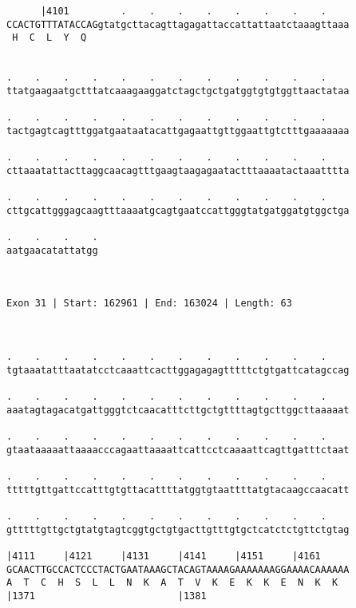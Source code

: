\documentclass{article}
\begin{document}
\begin{Verbatim}
      |4101         .    .    .    .    .    .    .    .    
CCACTGTTTATACCAGgtatgcttacagttagagattaccattattaatctaaagttaaa
 H  C  L  Y  Q                                              
                                                            
  
.    .    .    .    .    .    .    .    .    .    .    .    
ttatgaagaatgctttatcaaagaaggatctagctgctgatggtgtgtggttaactataa
                                                            
.    .    .    .    .    .    .    .    .    .    .    .    
tactgagtcagtttggatgaataatacattgagaattgttggaattgtctttgaaaaaaa
                                                            
.    .    .    .    .    .    .    .    .    .    .    .    
cttaaatattacttaggcaacagtttgaagtaagagaatactttaaaatactaaatttta
                                                            
.    .    .    .    .    .    .    .    .    .    .    .    
cttgcattgggagcaagtttaaaatgcagtgaatccattgggtatgatggatgtggctga
                                                            
.    .    .    .
aatgaacatattatgg
                
                
 
Exon 31 | Start: 162961 | End: 163024 | Length: 63



.    .    .    .    .    .    .    .    .    .    .    .    
tgtaaatatttaatatcctcaaattcacttggagagagtttttctgtgattcatagccag
                                                            
.    .    .    .    .    .    .    .    .    .    .    .    
aaatagtagacatgattgggtctcaacatttcttgctgttttagtgcttggcttaaaaat
                                                            
.    .    .    .    .    .    .    .    .    .    .    .    
gtaataaaaattaaaacccagaattaaaattcattcctcaaaattcagttgatttctaat
                                                            
.    .    .    .    .    .    .    .    .    .    .    .    
tttttgttgattccatttgtgttacattttatggtgtaattttatgtacaagccaacatt
                                                            
.    .    .    .    .    .    .    .    .    .    .    .    
gtttttgttgctgtatgtagtcggtgctgtgacttgtttgtgctcatctctgttctgtag
                                                            
|4111     |4121     |4131     |4141     |4151     |4161     
GCAACTTGCCACTCCCTACTGAATAAAGCTACAGTAAAAGAAAAAAAGGAAAACAAAAAA
A  T  C  H  S  L  L  N  K  A  T  V  K  E  K  K  E  N  K  K  
|1371                         |1381                         
  

\end{Verbatim}
\end{document}
